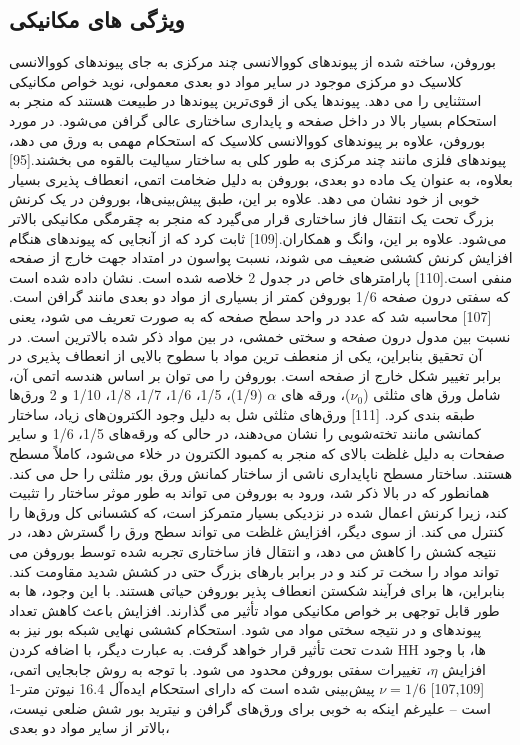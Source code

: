 \subsection{ویژگی های مکانیکی}
بوروفن، ساخته شده از پیوندهای کووالانسی چند مرکزی به جای پیوندهای کووالانسی کلاسیک دو مرکزی موجود در سایر مواد دو بعدی معمولی، نوید خواص مکانیکی استثنایی را می دهد. پیوندها یکی از قوی‌ترین پیوندها در طبیعت هستند که منجر به استحکام بسیار بالا در داخل صفحه و پایداری ساختاری عالی گرافن می‌شود. در مورد بوروفن، علاوه بر پیوندهای کووالانسی کلاسیک که استحکام مهمی به ورق می دهد، پیوندهای فلزی مانند چند مرکزی به طور کلی به ساختار سیالیت بالقوه می بخشند.\cite{zhangTwoDimensionalBoronMonolayers2015}[95] بعلاوه، به عنوان یک ماده دو بعدی، بوروفن به دلیل ضخامت اتمی، انعطاف پذیری بسیار خوبی از خود نشان می دهد. علاوه بر این، طبق پیش‌بینی‌ها، بوروفن در یک کرنش بزرگ تحت یک انتقال فاز ساختاری قرار می‌گیرد که منجر به چقرمگی مکانیکی بالاتر می‌شود. علاوه بر این، وانگ و همکاران.\cite{wangStrainEffectsBorophene2016}[109] ثابت کرد که از آنجایی که پیوندهای  هنگام افزایش کرنش کششی ضعیف می شوند، نسبت پواسون در امتداد جهت خارج از صفحه منفی است.\cite{liuRecentProgressGrapheneanalogous2019}[110] پارامترهای خاص در جدول 2 خلاصه شده است. نشان داده شده است که سفتی درون صفحه 1/6 بوروفن کمتر از بسیاری از مواد دو بعدی مانند گرافن است.\cite{zhangElasticityFlexibilityIdeal2017}[107] محاسبه شد که عدد  در واحد سطح صفحه  که به صورت  تعریف می شود، یعنی نسبت بین مدول درون صفحه و سختی خمشی، در بین مواد ذکر شده بالاترین است. در آن تحقیق بنابراین، یکی از منعطف ترین مواد با سطوح بالایی از انعطاف پذیری در برابر تغییر شکل خارج از صفحه است. بوروفن را می توان بر اساس هندسه اتمی آن، شامل ورق های مثلثی ($\nu_0$)، ورقه های $\alpha$ (1/9)، 1/5، 1/6، 1/7، 1/8، 1/10 و 2 ورق‌ها طبقه بندی کرد. \cite{zhaoPhononmediatedSuperconductivityBorophenes2016}[111] ورق‌های مثلثی شل به دلیل وجود الکترون‌های زیاد، ساختار کمانشی مانند تخته‌شویی را نشان می‌دهند، در حالی که ورقه‌های 1/5، 1/6 و سایر صفحات به دلیل غلظت بالای  که منجر به کمبود الکترون در خلاء می‌شود، کاملاً مسطح هستند. ساختار مسطح ناپایداری ناشی از ساختار کمانش ورق بور مثلثی را حل می کند. همانطور که در بالا ذکر شد، ورود  به بوروفن می تواند به طور موثر ساختار را تثبیت کند، زیرا کرنش اعمال شده در نزدیکی  بسیار متمرکز است، که کشسانی کل ورق‌ها را کنترل می کند. از سوی دیگر، افزایش غلظت  می تواند سطح ورق را گسترش دهد، در نتیجه کشش را کاهش می دهد، و انتقال فاز ساختاری تجربه شده توسط بوروفن می تواند مواد را سخت تر کند و در برابر بارهای بزرگ حتی در کشش شدید مقاومت کند. بنابراین،  ها برای فرآیند شکستن انعطاف پذیر بوروفن حیاتی هستند. با این وجود،  ها به طور قابل توجهی بر خواص مکانیکی مواد تأثیر می گذارند. افزایش  باعث کاهش تعداد پیوندهای  و در نتیجه سختی مواد می شود. استحکام کششی نهایی شبکه بور نیز به شدت تحت تأثیر قرار خواهد گرفت. به عبارت دیگر، با اضافه کردن HH ها، با وجود افزایش $\eta$، تغییرات سفتی بوروفن محدود می شود. با توجه به روش جابجایی اتمی، \cite{zhangElasticityFlexibilityIdeal2017, schabelENERGETICSINTERPLANARBINDING1992, wangStrainEffectsBorophene2016}[107,109] $\nu=1/6$ پیش‌بینی شده است که دارای استحکام ایده‌آل 16.4 نیوتن متر-1 است – علیرغم اینکه به خوبی برای ورق‌های گرافن و نیترید بور شش ضلعی  نیست، بالاتر از سایر مواد دو بعدی، 